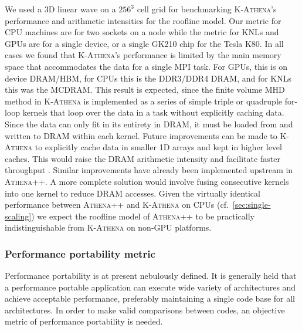 \documentclass[10pt,journal,compsoc]{IEEEtran}
\newcommand{\textcode}[1]{\textsc{#1}}
\newcommand{\athena}{\textcode{Athena++}\xspace}
\newcommand{\kathena}{\textcode{K-Athena}\xspace}
\newcommand{\mpi}{\textcode{MPI}\xspace}
\begin{document}
We used a 3D linear wave on a $256^3$ cell grid for benchmarking \kathena's
performance and arithmetic intensities for the roofline model. Our metric for CPU
machines are for two sockets on a node while the metric for KNLs and GPUs are for
a single device, or a single GK210 chip for the Tesla K80.  In all cases we
found that \kathena's performance is limited by the main memory space that
accommodates the data for a single \mpi task. For GPUs, this is on device
DRAM/HBM, for CPUs this is the DDR3/DDR4 DRAM, and for KNLs this was the
MCDRAM. This result is expected, since the finite volume MHD method in \kathena
is implemented as a series of simple triple or quadruple for-loop kernels that
loop over the data in a task without explicitly caching data.  Since the data
can only fit in its entirety in DRAM, it must be loaded from and written to
DRAM within each kernel.  Future improvements can be made to \kathena to
explicitly cache data in smaller 1D arrays and kept in higher level caches.
This would raise the DRAM arithmetic intensity and facilitate faster
throughput \cite{glines_scalable_2015}.  Similar improvements have already
been implemented upstream in \athena. A more complete solution would involve
fusing consecutive kernels into one kernel to reduce DRAM accesses.
Given the virtually identical performance between \athena and \kathena on
CPUs (cf.~\ref{sec:single-scaling}) we expect the roofline model of \athena
to be practically indistinguishable from \kathena on non-GPU platforms.

\subsubsection{Performance portability metric}
\label{sec:performance-portability-metric}

Performance portability is at present nebulously defined. It is generally held
that a performance portable application can execute wide variety of
architectures and achieve acceptable performance, preferably maintaining a
single code base for all architectures. In order to make valid comparisons
between codes, an objective metric of performance portability is needed.
\end{document}
